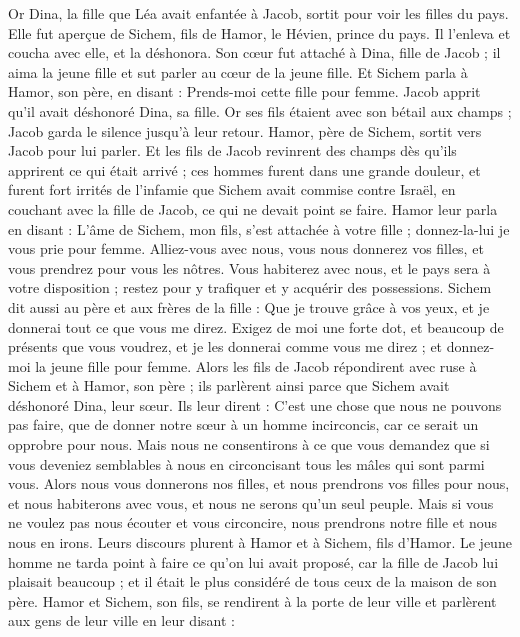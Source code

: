 \begin{multicols}{2}
\VerseOne{}Or Dina, la fille que Léa avait enfantée à Jacob, sortit pour voir les filles du pays.
Elle fut aperçue de Sichem, fils de Hamor, le Hévien, prince du pays. Il l'enleva et coucha avec elle, et la déshonora.
Son cœur fut attaché à Dina, fille de Jacob ; il aima la jeune fille et sut parler au cœur de la jeune fille.
Et Sichem parla à Hamor, son père, en disant : Prends-moi cette fille pour femme.
Jacob apprit qu'il avait déshonoré Dina, sa fille. Or ses fils étaient avec son bétail aux champs ; Jacob garda le silence jusqu'à leur retour.
Hamor, père de Sichem, sortit vers Jacob pour lui parler.
Et les fils de Jacob revinrent des champs dès qu'ils apprirent ce qui était arrivé ; ces hommes furent dans une grande douleur, et furent fort irrités de l'infamie que Sichem avait commise contre Israël, en couchant avec la fille de Jacob, ce qui ne devait point se faire.
Hamor leur parla en disant : L'âme de Sichem, mon fils, s'est attachée à votre fille ; donnez-la-lui je vous prie pour femme.
Alliez-vous avec nous, vous nous donnerez vos filles, et vous prendrez pour vous les nôtres.
Vous habiterez avec nous, et le pays sera à votre disposition ; restez pour y trafiquer et y acquérir des possessions.
Sichem dit aussi au père et aux frères de la fille : Que je trouve grâce à vos yeux, et je donnerai tout ce que vous me direz.
Exigez de moi une forte dot, et beaucoup de présents que vous voudrez, et je les donnerai comme vous me direz ; et donnez-moi la jeune fille pour femme.
Alors les fils de Jacob répondirent avec ruse à Sichem et à Hamor, son père ; ils parlèrent ainsi parce que Sichem avait déshonoré Dina, leur sœur.
Ils leur dirent : C'est une chose que nous ne pouvons pas faire, que de donner notre sœur à un homme incirconcis, car ce serait un opprobre pour nous.
Mais nous ne consentirons à ce que vous demandez que si vous deveniez semblables à nous en circoncisant tous les mâles qui sont parmi vous.
Alors nous vous donnerons nos filles, et nous prendrons vos filles pour nous, et nous habiterons avec vous, et nous ne serons qu'un seul peuple.
Mais si vous ne voulez pas nous écouter et vous circoncire, nous prendrons notre fille et nous nous en irons.
Leurs discours plurent à Hamor et à Sichem, fils d'Hamor.
Le jeune homme ne tarda point à faire ce qu'on lui avait proposé, car la fille de Jacob lui plaisait beaucoup ; et il était le plus considéré de tous ceux de la maison de son père.
Hamor et Sichem, son fils, se rendirent à la porte de leur ville et parlèrent aux gens de leur ville en leur disant :

\end{multicols}

